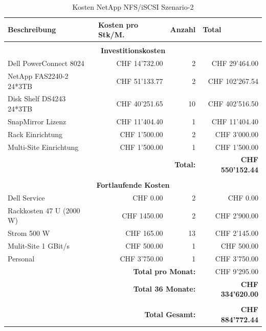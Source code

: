 \begin{table}[htbp]
\caption{Kosten NetApp NFS/iSCSI Szenario-2}
\begin{small}
\begin{tabular}{|l|r|r|r|}
\hline
\textbf{Beschreibung} & \multicolumn{1}{l|}{\textbf{Kosten pro Stk/M.}} & \multicolumn{1}{l|}{\textbf{Anzahl}} & \multicolumn{1}{l|}{\textbf{Total}} \\ \hline
 \multicolumn{ 4}{c}{} \\ \hline
\multicolumn{ 4}{|c|}{\textbf{Investitionskosten}} \\ \hline
Dell PowerConnect 8024 & CHF 14'732.00 & 2 & CHF 29'464.00 \\ \hline
NetApp FAS2240-2 24*3TB & CHF 51'133.77 & 2 & CHF 102'267.54 \\ \hline
Disk Shelf DS4243 24*3TB & CHF 40'251.65 & 10 & CHF 402'516.50 \\ \hline
SnapMirror Lizenz & CHF 11'404.40 & 1 & CHF  11'404.40 \\ \hline
Rack Einrichtung & CHF 1'500.00 & 2 & CHF 3'000.00 \\ \hline 
Multi-Site Einrichtung & CHF 1'500.00 & 1 & CHF 1'500.00 \\ \hline \hline
 \multicolumn{ 3}{r|}{\textbf{Total:}} & \textbf{CHF 550'152.44} \\ 
 \cline{4-4}
\multicolumn{ 4}{c}{} \\ \hline
\multicolumn{ 4}{|c|}{\textbf{Fortlaufende Kosten}} \\ \hline
Dell Service & CHF 0.00 & 2 & CHF 0.00 \\ \hline
Rackkosten 47 U (2000 W) & CHF 1450.00 & 2 & CHF 2'900.00 \\ \hline
Strom 500 W & CHF 165.00 & 13 & CHF 2'145.00 \\ \hline
Mulit-Site 1 GBit/s & CHF 500.00 & 1 & CHF 500.00 \\ \hline
Personal & CHF 3'750.00 & 1 & CHF 3'750.00 \\ \hline \hline
 \multicolumn{ 3}{r|}{\textbf{Total pro Monat:}} & CHF 9'295.00 \\
\cline{4-4}
 \multicolumn{ 3}{r|}{\textbf{Total 36 Monate:}} & \textbf{CHF 334'620.00} \\ \cline{4-4}
 \multicolumn{ 4}{c}{} \\ \cline{4-4}
 \multicolumn{ 3}{r|}{\textbf{Total Gesamt:}} & \textbf{CHF 884'772.44} \\ \cline{4-4}
\end{tabular}
\end{small}
\label{KostenNetAppS2}
\end{table}

